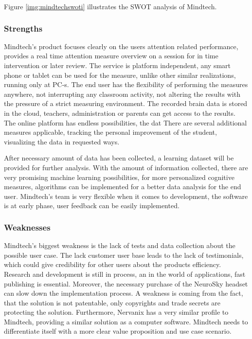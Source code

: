 \documentclass[letterpaper,10pt]{article}
\begin{document}
Figure \ref{img:mindtechswoti} illustrates the SWOT analysis of Mindtech.

\subsubsection{Strengths}

Mindtech's product focuses clearly on the users attention related performance, provides a real time attention measure overview on a session for in time intervention or later review. The service is platform independent, any smart phone or tablet can be used for the measure, unlike other similar realizations, running only at PC-s. The end user has the flexibility of performing the measures anywhere, not interrupting any classroom activity, not altering the results with the pressure of a strict measuring environment. The recorded brain data is stored in the cloud, teachers, administration or parents can get access to the results. The online platform has endless possibilities, the dat  There are several additional measures applicable, tracking the personal improvement of the student, visualizing the data in requested ways. 

After necessary amount of data has been collected, a learning dataset will be provided for further analysis. With the amount of information collected, there are very promising machine learning possibilities, for more personalized cognitive measures, algorithms can be implemented for a better data analysis for the end user. Mindtech's team is very flexible when it comes to development, the software is at early phase, user feedback can be easily implemented.

\subsubsection{Weaknesses}

Mindtech's biggest weakness is the lack of tests and data collection about the possible user case. The lack customer user base leads to the lack of testimonials, which could give credibility for other users about the products efficiency. Research and development is still in process, an in the world of applications, fast publishing is essential. Moreover, the necessary purchase of the NeuroSky headset can slow down the implementation process.
A weakness is coming from the fact, that the solution is not patentable, only copyrights and trade secrets are protecting the solution. 
Furthermore, Nervanix has a very similar profile to Mindtech, providing a similar solution as a computer software. Mindtech needs to differentiate itself with a more clear value proposition and use case scenario. 
\end{document}
